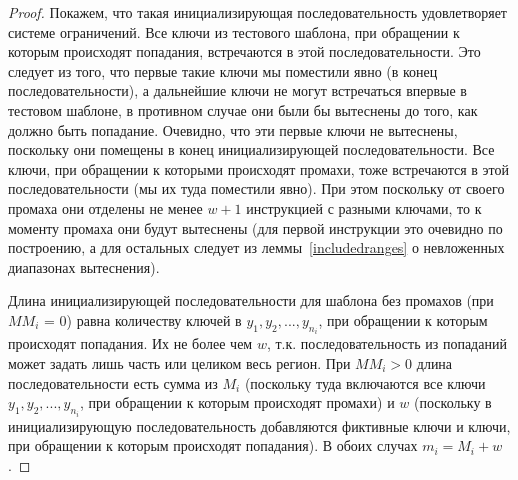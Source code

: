 \begin{proof}
  Покажем, что такая инициализирующая последовательность удовлетворяет системе ограничений. Все ключи из тестового шаблона, при обращении к которым происходят попадания, встречаются в
  этой последовательности. Это следует из того, что первые такие ключи мы поместили явно (в конец последовательности), а дальнейшие ключи не могут встречаться впервые в тестовом шаблоне, в противном случае они были бы вытеснены до того, как должно быть попадание. Очевидно, что эти первые ключи не вытеснены, поскольку они помещены в конец инициализирующей последовательности. Все ключи, при обращении к которыми происходят промахи, тоже встречаются в этой последовательности (мы их туда поместили явно). При этом поскольку от своего промаха они отделены не менее $w+1$ инструкцией с разными ключами, то к моменту промаха они будут
  вытеснены (для первой инструкции это очевидно по построению, а
  для остальных следует из леммы~\ref{includedranges} о невложенных диапазонах вытеснения).

  Длина инициализирующей последовательности для шаблона без промахов (при $MM_i$ = 0) равна количеству ключей в $y_1, y_2, ..., y_{n_i}$, при обращении к
  которым происходят попадания. Их не более чем $w$,
  т.к. последовательность из попаданий может задать лишь часть
  или целиком весь регион. При $MM_i > 0$ длина последовательности
  есть сумма из $M_i$ (поскольку туда включаются все ключи $y_1, y_2,
  ..., y_{n_i}$, при обращении к которым происходят промахи) и
  $w$ (поскольку в инициализирующую последовательность добавляются фиктивные ключи и ключи, при обращении к которым происходят попадания). В обоих случах $m_i = M_i + w$.
\end{proof}

